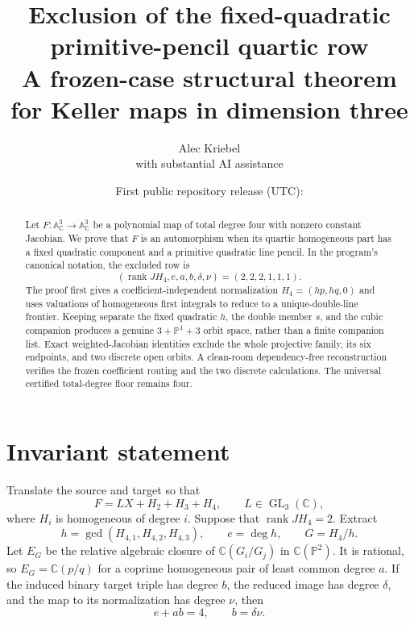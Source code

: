\documentclass[11pt]{article}
\title{\bfseries Exclusion of the fixed-quadratic primitive-pencil
quartic row\\[3pt]
\large A frozen-case structural theorem for Keller maps in dimension three}
\author{Alec Kriebel\\with substantial AI assistance}
\date{First public repository release (UTC):
  \texttt{\detokenize{2026-07-26T00:45:00Z}}}
\theoremstyle{remark}
\newcommand{\A}{\mathbb A}
\newcommand{\C}{\mathbb C}
\newcommand{\PP}{\mathbb P}
\newcommand{\rank}{\operatorname{rank}}
\begin{document}
\maketitle

\begin{center}
\end{center}

\begin{abstract}
Let $F:\A^3_\C\to\A^3_\C$ be a polynomial map of total degree four with
nonzero constant Jacobian.  We prove that $F$ is an automorphism when its
quartic homogeneous part has a fixed quadratic component and a primitive
quadratic line pencil.  In the program's canonical notation, the excluded
row is
\[
(\rank JH_4,e,a,b,\delta,\nu)=(2,2,2,1,1,1).
\]
The proof first gives a coefficient-independent normalization
$H_4=(hp,hq,0)$ and uses valuations of homogeneous first integrals to reduce
to a unique-double-line frontier.  Keeping separate the fixed quadratic
$h$, the double member $s$, and the cubic companion produces a genuine
$3+\PP^1+3$ orbit space, rather than a finite companion list.  Exact
weighted-Jacobian identities exclude the whole projective family, its six
endpoints, and two discrete open orbits.  A clean-room dependency-free
reconstruction verifies the frozen coefficient routing and the two discrete
calculations.  The universal certified total-degree floor remains four.
\end{abstract}

\section{Invariant statement}

Translate the source and target so that
\begin{equation}
F=LX+H_2+H_3+H_4,\qquad L\in\operatorname{GL}_3(\C),
\label{eq:F}
\end{equation}
where $H_i$ is homogeneous of degree $i$.  Suppose that
$\rank JH_4=2$.  Extract
\[
h=\gcd(H_{4,1},H_{4,2},H_{4,3}),\qquad e=\deg h,
\qquad G=H_4/h.
\]
Let $E_G$ be the relative algebraic closure of
$\C(G_i/G_j)$ in $\C(\PP^2)$.  It is rational, so
$E_G=\C(p/q)$ for a coprime homogeneous pair of least common degree $a$.
If the induced binary target triple has degree $b$, the reduced image has
degree $\delta$, and the map to its normalization has degree $\nu$, then
\[
e+ab=4,\qquad b=\delta\nu.
\]
\end{document}
